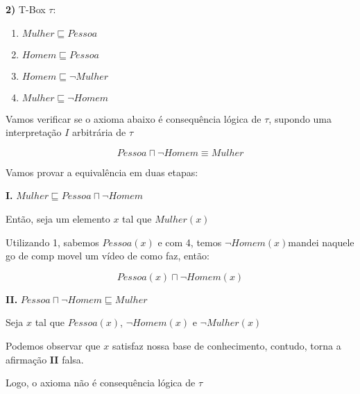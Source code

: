 \documentclass{article}
\begin{document}
\textbf{2)} T-Box $\tau$:

\begin{enumerate}
    \item  $Mulher \sqsubseteq Pessoa$
    \item  $Homem \sqsubseteq Pessoa$
    \item  $Homem \sqsubseteq \neg Mulher$
    \item  $Mulher \sqsubseteq \neg Homem$
\end{enumerate}

Vamos verificar se o axioma abaixo é consequência lógica de $\tau$, 
supondo uma interpretação $I$ arbitrária de $\tau$

$$Pessoa \sqcap \neg Homem \equiv Mulher$$

\newpage

Vamos provar a equivalência em duas etapas:

\textbf{I.} $Mulher \sqsubseteq Pessoa \sqcap \neg Homem$

Então, seja um elemento $x$ tal que $Mulher(x)$

Utilizando 1, sabemos $Pessoa(x)$
e com 4, temos $\neg Homem(x)$mandei naquele go de comp movel um vídeo de como faz, então:

$$Pessoa(x) \sqcap \neg Homem(x)$$

\textbf{II.} $Pessoa \sqcap \neg Homem  \sqsubseteq Mulher$

Seja $x$ tal que $Pessoa(x)$, $\neg Homem(x)$ e $\neg Mulher(x)$

Podemos observar que $x$ satisfaz nossa base de conhecimento, contudo, 
torna a afirmação \textbf{II} falsa.

Logo, o axioma não é consequência lógica de $\tau$






\end{document}
